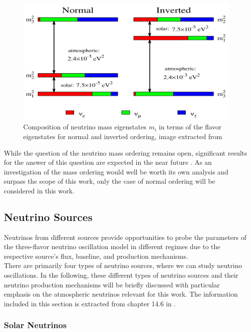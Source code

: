 \documentclass[a4paper,12pt,numbered]{article}
\begin{document}
\begin{figure}[H]
\includegraphics[width=\textwidth]{Neutrino_Figures/nmo.png}
\caption{Composition of neutrino mass eigenstates $m_i$ in terms of the flavor eigenstates for normal and inverted ordering, image extracted from \cite{nmo_image_source}}
\end{figure}

While the question of the neutrino mass ordering remains open, significant results for the answer of this question are expected in the near future \cite{future_nmo_sensitivity}. As an investigation of the mass ordering would well be worth its own analysis and surpass the scope of this work, only the case of normal ordering will be considered in this work.

\subsection{Neutrino Sources}

Neutrinos from different sources provide opportunities to probe the parameters of the three-flavor neutrino oscillation model in different regimes due to the respective source's flux, baseline, and production mechanisms. 
\\
There are primarily four types of neutrino sources, where we can study neutrino oscillations. In the following, these different types of neutrino sources and their neutrino production mechanisms will be briefly discussed with particular emphasis on the atmospheric neutrinos relevant for this work. The information included in this section is extracted from chapter 14.6 in \cite{entire_pdg}.

\subsubsection{Solar Neutrinos}
\end{document}

